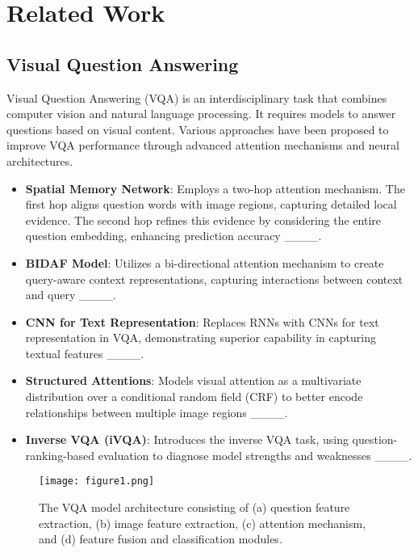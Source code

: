 \section{Related Work}
\subsection{Visual Question Answering}
Visual Question Answering (VQA) is an interdisciplinary task that combines computer vision and natural language processing. It requires models to answer questions based on visual content. Various approaches have been proposed to improve VQA performance through advanced attention mechanisms and neural architectures.

\begin{itemize}
    \item \textbf{Spatial Memory Network}: Employs a two-hop attention mechanism. The first hop aligns question words with image regions, capturing detailed local evidence. The second hop refines this evidence by considering the entire question embedding, enhancing prediction accuracy ____.
    \item \textbf{BIDAF Model}: Utilizes a bi-directional attention mechanism to create query-aware context representations, capturing interactions between context and query ____.
    \item \textbf{CNN for Text Representation}: Replaces RNNs with CNNs for text representation in VQA, demonstrating superior capability in capturing textual features ____.
    \item \textbf{Structured Attentions}: Models visual attention as a multivariate distribution over a conditional random field (CRF) to better encode relationships between multiple image regions ____.
    \item \textbf{Inverse VQA (iVQA)}: Introduces the inverse VQA task, using question-ranking-based evaluation to diagnose model strengths and weaknesses ____.
\end{itemize}
\begin{figure*}[!t]
    \centering
    \texttt{[image: figure1.png]} %
    \caption{The VQA model architecture consisting of (a) question feature extraction, (b) image feature extraction, (c) attention mechanism, and (d) feature fusion and classification modules.}
    \label{fig:framework}
\end{figure*}
